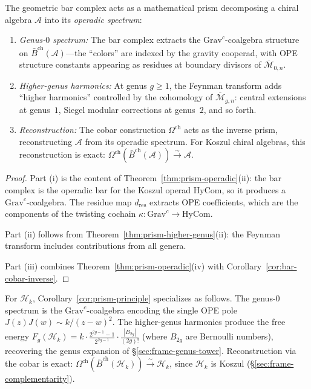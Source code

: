 \begin{corollary}\label{cor:prism-principle}
The geometric bar complex acts as a mathematical prism decomposing a
chiral algebra $\mathcal{A}$ into its \emph{operadic spectrum}:
\begin{enumerate}[label=\textup{(\roman*)}]
\item \emph{Genus-$0$ spectrum:} The bar complex extracts the
  $\mathrm{Grav}^c$-coalgebra structure on $\bar{B}^{\mathrm{ch}}(
  \mathcal{A})$---the ``colors'' are indexed by the gravity cooperad,
  with OPE structure constants appearing as residues at boundary
  divisors of $\overline{\mathcal{M}}_{0,n}$.
\item \emph{Higher-genus harmonics:} At genus $g \geq 1$, the
  Feynman transform adds ``higher harmonics'' controlled by the
  cohomology of $\overline{\mathcal{M}}_{g,n}$: central extensions
  at genus~$1$, Siegel modular corrections at genus~$2$, and
  so forth.
\item \emph{Reconstruction:} The cobar construction
  $\Omega^{\mathrm{ch}}$ acts as the inverse prism, reconstructing
  $\mathcal{A}$ from its operadic spectrum.  For Koszul chiral
  algebras, this reconstruction is exact:
  $\Omega^{\mathrm{ch}}(\bar{B}^{\mathrm{ch}}(\mathcal{A}))
  \xrightarrow{\sim} \mathcal{A}$.
\end{enumerate}
\end{corollary}

\begin{proof}
Part (i) is the content of Theorem~\ref{thm:prism-operadic}(ii):
the bar complex is the operadic bar for the Koszul operad
$\mathrm{HyCom}$, so it produces a $\mathrm{Grav}^c$-coalgebra.
The residue map $d_{\mathrm{res}}$ extracts OPE coefficients, which
are the components of the twisting cochain
$\kappa\colon \mathrm{Grav}^c \to \mathrm{HyCom}$.

Part (ii) follows from Theorem~\ref{thm:prism-higher-genus}(ii):
the Feynman transform includes contributions from all genera.

Part (iii) combines
Theorem~\ref{thm:prism-operadic}(iv)
with Corollary~\ref{cor:bar-cobar-inverse}.
\end{proof}

\begin{example}
For $\mathcal{H}_k$, Corollary~\ref{cor:prism-principle} specializes as follows.  The genus-$0$ spectrum is the $\mathrm{Grav}^c$-coalgebra encoding the single OPE pole $J(z)J(w) \sim k/(z-w)^2$.  The higher-genus harmonics produce the free energy $F_g(\mathcal{H}_k) = k \cdot \frac{2^{2g-1}-1}{2^{2g-1}} \cdot \frac{|B_{2g}|}{(2g)!}$ (where $B_{2g}$ are Bernoulli numbers), recovering the genus expansion of \S\ref{sec:frame-genus-tower}.  Reconstruction via the cobar is exact: $\Omega^{\mathrm{ch}}(\bar{B}^{\mathrm{ch}}(\mathcal{H}_k)) \xrightarrow{\sim} \mathcal{H}_k$, since $\mathcal{H}_k$ is Koszul (\S\ref{sec:frame-complementarity}).
\end{example}

